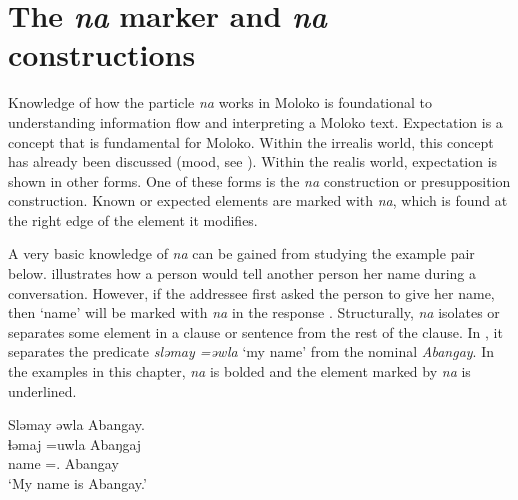 \chapter[The na marker and na constructions]{The \textit{na} marker and \textit{na} constructions}\label{chap:11}
\hypertarget{RefHeading1213141525720847}{}
Knowledge of how the particle \textit{na} works in Moloko is foundational to understanding information flow and interpreting a Moloko text. Expectation is a concept that is fundamental for Moloko. Within the irrealis world, this concept has already been discussed (mood, see ). Within the realis world, expectation is shown in other forms. One of these forms is the \textit{na} construction or presupposition construction. Known or expected elements are marked with \textit{na}, which is found at the right edge of the element it modifies.

A very basic knowledge of \textit{na} can be gained from studying the example pair below.  illustrates how a person would tell another person her name during a conversation. However, if the addressee first asked the person to give her name, then ‘name’ will be marked with \textit{na} in the response . Structurally, \textit{na}  isolates or separates some element in a clause or sentence from the rest of the clause. In , it separates the predicate \textit{sl}\textit{əmay =əwla} ‘my name’ from the nominal \textit{Abangay}. In the examples in this chapter, \textit{na} is bolded and the element marked by \textit{na}  is underlined.

\ea \label{ex:11:1}
Sləmay  əwla  Abangay.\\
\gll  ɬəmaj   =uwla     Abaŋgaj\\
      name  ={\oneS}.{\POSS}  Abangay\\
\glt  ‘My name is Abangay.’
\z

